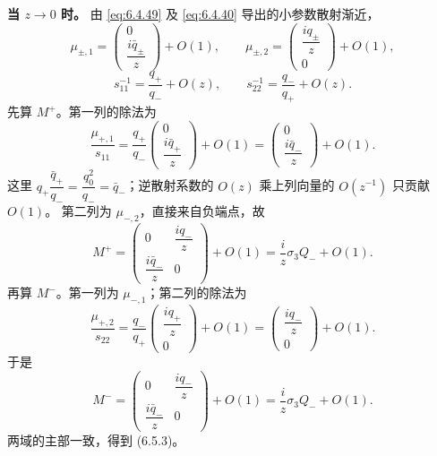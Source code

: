 \documentclass[lang=cn,scheme=chinese,mode=simple,device=normal,color=blue,
math=cm,thmcnt=section,12pt]{elegantbook}
\begin{document}
\begin{callout}[计算：两个域的背景主部和亚纯性]
    \textbf{当 $z\to0$ 时。}
    由 \eqref{eq:6.4.49} 及 \eqref{eq:6.4.40} 导出的小参数散射渐近，
    \[
        \mu_{\pm,1}=\begin{pmatrix}0\\\dfrac{i\bar q_\pm}{z}\end{pmatrix}+O(1),\qquad
        \mu_{\pm,2}=\begin{pmatrix}\dfrac{iq_\pm}{z}\\0\end{pmatrix}+O(1),
    \]
    \[
        s_{11}^{-1}=\dfrac{q_+}{q_-}+O(z),\qquad
        s_{22}^{-1}=\dfrac{q_-}{q_+}+O(z).
    \]
    先算 $M^+$。第一列的除法为
    \[
        \dfrac{\mu_{+,1}}{s_{11}}
        =\dfrac{q_+}{q_-}\begin{pmatrix}0\\\dfrac{i\bar q_+}{z}\end{pmatrix}+O(1)
        =\begin{pmatrix}0\\\dfrac{i\bar q_-}{z}\end{pmatrix}+O(1).
    \]
    这里 $q_+\dfrac{\bar q_+}{q_-}=\dfrac{q_0^2}{q_-}=\bar q_-$；逆散射系数的 $O(z)$
    乘上列向量的 $O(z^{-1})$ 只贡献 $O(1)$。
    第二列为 $\mu_{-,2}$，直接来自负端点，故
    \[
        M^+=\begin{pmatrix}0&\dfrac{iq_-}{z}\\\dfrac{i\bar q_-}{z}&0\end{pmatrix}+O(1)
        =\dfrac{i}{z}\sigma_3Q_-+O(1).
    \]
    再算 $M^-$。第一列为 $\mu_{-,1}$；第二列的除法为
    \[
        \dfrac{\mu_{+,2}}{s_{22}}
        =\dfrac{q_-}{q_+}\begin{pmatrix}\dfrac{iq_+}{z}\\0\end{pmatrix}+O(1)
        =\begin{pmatrix}\dfrac{iq_-}{z}\\0\end{pmatrix}+O(1).
    \]
    于是
    \[
        M^-=\begin{pmatrix}0&\dfrac{iq_-}{z}\\\dfrac{i\bar q_-}{z}&0\end{pmatrix}+O(1)
        =\dfrac{i}{z}\sigma_3Q_-+O(1).
    \]
    两域的主部一致，得到 (6.5.3)。


\end{callout}
\end{document}
